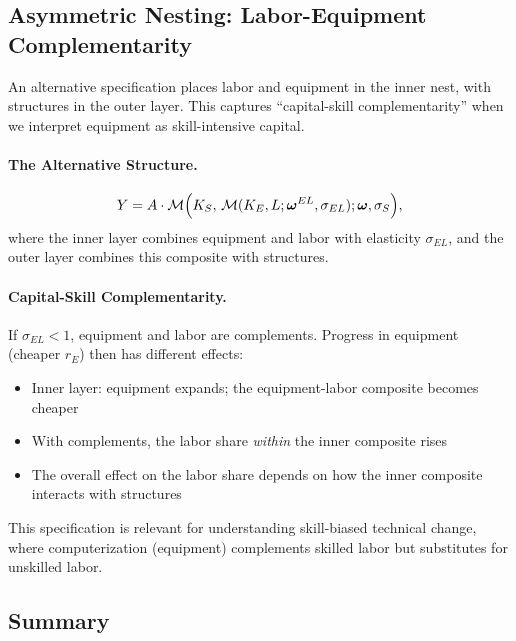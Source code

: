 \subsection{Asymmetric Nesting: Labor-Equipment Complementarity}
\label{subsec:asymmetric-nesting}

An alternative specification places labor and equipment in the inner nest, with structures in the outer layer. This captures ``capital-skill complementarity'' when we interpret equipment as skill-intensive capital.

\paragraph{The Alternative Structure.}
\begin{equation}
Y = A \cdot \mathcal{M}\Bigl(K_S, \, \mathcal{M}(K_E, L; \boldsymbol{\omega}^{EL}, \sigma_{EL}); \boldsymbol{\omega}, \sigma_S\Bigr),
\label{eq:alt-nested}
\end{equation}
where the inner layer combines equipment and labor with elasticity $\sigma_{EL}$, and the outer layer combines this composite with structures.

\paragraph{Capital-Skill Complementarity.}
If $\sigma_{EL} < 1$, equipment and labor are complements. Progress in equipment (cheaper $r_E$) then has different effects:
\begin{itemize}[nosep]
\item Inner layer: equipment expands; the equipment-labor composite becomes cheaper
\item With complements, the labor share \emph{within} the inner composite rises
\item The overall effect on the labor share depends on how the inner composite interacts with structures
\end{itemize}

This specification is relevant for understanding skill-biased technical change, where computerization (equipment) complements skilled labor but substitutes for unskilled labor.

\subsection{Summary}
\label{subsec:nested-summary}

